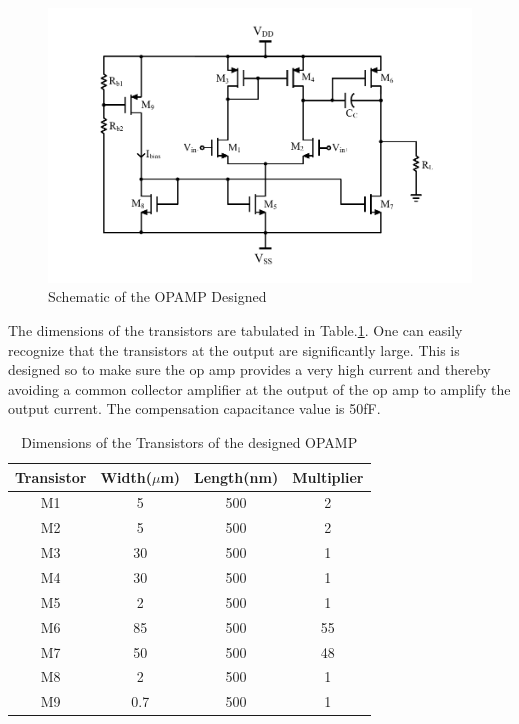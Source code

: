 \begin{figure} [H]
\centering
\includegraphics[scale=1]{Figures/Schematics/OPAMP_Vbias.pdf}
\caption{Schematic of the OPAMP Designed}
\label{fig:OPAMP_Schematic}
\end{figure}

The dimensions of the transistors are tabulated in Table.\ref{tab:OPAMP_dimensions}. One can easily recognize that the transistors at the output are significantly large. This is designed so to make sure the op amp provides a very high current and thereby avoiding a common collector amplifier at the output of the op amp to amplify the output current. The compensation capacitance value is 50fF.

\begin{table} [H]
\centering
\begin{tabular}{@{}cccc@{}}
\toprule
Transistor			& Width($\mu$m)		& Length(nm)		& Multiplier \\ \midrule
M1					& 5					& 500				& 2			\\
M2					& 5					& 500				& 2			\\ 
M3					& 30 				& 500				& 1			\\
M4					& 30 				& 500				& 1			\\ 
M5					& 2 				& 500				& 1			\\
M6					& 85 				& 500				& 55		\\ 
M7					& 50 				& 500				& 48		\\
M8					& 2 				& 500				& 1			\\ 
M9					& 0.7				& 500				& 1			\\
\bottomrule
\end{tabular}
\caption{Dimensions of the Transistors of the designed OPAMP}
\label{tab:OPAMP_dimensions}
\end{table}

